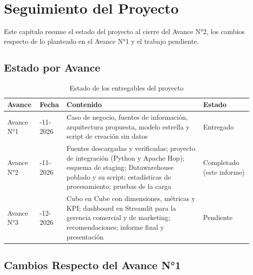 \section{Seguimiento del Proyecto}
\label{sec:seguimiento}

Este capítulo resume el estado del proyecto al cierre del Avance N°2, los
cambios respecto de lo planteado en el Avance N°1 y el trabajo pendiente.

\subsection{Estado por Avance}

\begin{table}[!htbp]
  \centering
  \caption{Estado de los entregables del proyecto}
  \label{tab:seguimiento}
  \small
  \begin{tabularx}{\linewidth}{@{}>{\raggedright\arraybackslash}p{2.3cm}
                                  >{\raggedright\arraybackslash}p{1.8cm}
                                  >{\raggedright\arraybackslash}X
                                  >{\raggedright\arraybackslash}p{2.2cm}@{}}
    \toprule
    \textbf{Avance} & \textbf{Fecha} & \textbf{Contenido} & \textbf{Estado} \\
    \midrule
    Avance N°1 & 05-11-2026 & Caso de negocio, fuentes de información,
      arquitectura propuesta, modelo estrella y script de creación sin datos
      & Entregado \\
    Avance N°2 & 19-11-2026 & Fuentes descargadas y verificadas; proyecto de
      integración (Python y Apache Hop); esquema de staging; Datawarehouse
      poblado y su script; estadísticas de procesamiento; pruebas de la carga
      & Completado (este informe) \\
    Avance N°3 & 10-12-2026 & Cubo en Cube con dimensiones, métricas y KPI;
      dashboard en Streamlit para la gerencia comercial y de marketing;
      recomendaciones; informe final y presentación & Pendiente \\
    \bottomrule
  \end{tabularx}
\end{table}

\subsection{Cambios Respecto del Avance N°1}

